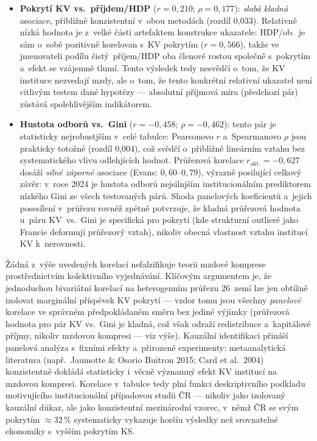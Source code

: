 \begin{itemize}
  \item \textbf{Pokrytí \ac{KV} vs.~příjdem/\ac{HDP}} ($r = 0{,}210$; $\rho = 0{,}177$):
    \emph{slabá kladná} asociace, přibližně konzistentní v~obou metodách (rozdíl 0,033).
    Relativně nízká hodnota je z~velké části artefaktem konstrukce ukazatele: \ac{HDP}/ob.~je sám o~sobě pozitivně korelovan s~\ac{KV} pokrytím ($r = 0{,}566$), takže ve jmenovateli podílu čistý~příjem/\ac{HDP} oba členové rostou společně s~pokrytím a~efekt se vzájemně tlumí.
    Tento výsledek tedy nesvědčí o~tom, že \ac{KV} instituce nezvedají mzdy, ale o~tom, že tento konkrétní relativní ukazatel není citlivým testem dané hypotézy --- absolutní příjmová míra (předchozí pár) zůstává spolehlivějším indikátorem.

  \item \textbf{Hustota odborů vs.~Gini} ($r = -0{,}458$; $\rho = -0{,}462$):
    tento pár je statisticky nejrobustjším v~celé tabulce: Pearsonovo $r$ a~Spearmanovo $\rho$ jsou prakticky totožné (rozdíl 0,004), což svědčí o~přibližně lineárním vztahu bez systematického vlivu odlehjících hodnot.
    Průřezová korelace $r_{\text{akt.}} = -0{,}627$ dosáží \emph{silné záporné} asociace (Evans: $0{,}60$--$0{,}79$), výrazně posilující celkový závěr: v~roce 2024 je hustota odborů nejsilnjším institucionálním prediktorem nízkého Gini ze všech testovaných párů.
    Shoda panelových koeficientů a~jejich posesílení v~průřezu rovněž zpětně potvrzuje, že kladná průřezová hodnota u~páru \ac{KV}~vs.~Gini je specifická pro pokrytí (kde strukturní outlieré jako Francie deformují průřezový vztah), nikoliv obecná vlastnost vztahu institucí \ac{KV} k~nerovnosti.
\end{itemize}

Žádná z~výše uvedených korelací nefalzifikuje teorii mzdové komprese prostřednictvím kolektivního vyjednávání.
Klíčovým argumentem je, že jednoduchou bivariátní korelací na heterogenním průřezu 26~zemí lze jen obtížně izolovat marginální příspěvek \ac{KV} pokrytí --- vzdor tomu jsou všechny \emph{panelové} korelace ve správném předpokládaném směru bez jediné výjimky (průřezová hodnota pro pár KV vs.~Gini je kladná, což však odraží redistribuce a~kapitálové příjmy, nikoliv mzdovou kompresi --- viz výše).
Kauzální identifikaci přináší panelová analýza s~fixními efekty a~přirozené experimenty: metaanalytická literatura (např.~Jaumotte \& Osorio Buitron 2015; Card et al.~2004) konzistentně dokládá statisticky i~věcně významný efekt \ac{KV} institucí na mzdovou kompresi.
Korelace v~tabulce tedy plní funkci deskriptivního podkladu motivujícího institucionální případ\-ovou studii ČR --- nikoliv jako izolovaný kauzální důkaz, ale jako konzistentní mezinárodní vzorec, v~němž ČR se svým pokrytím $\approx 32\,\%$ systematicky vykazuje horšíu výsledky než srovnatelné ekonomiky s~vyšším pokrytím \ac{KS}.


